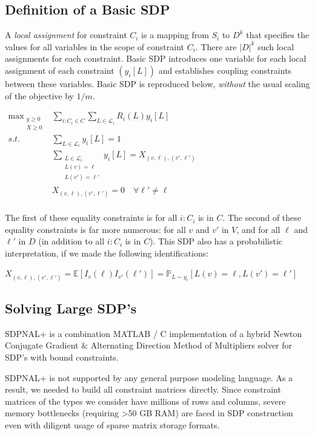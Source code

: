 \documentclass[11pt]{article} %
\begin{document}
\subsection{Definition of a Basic SDP}

A \emph{local assignment} for constraint $C_i$ is a mapping from $S_i$ to $D^k$ that specifies the values for all variables in the scope of constraint $C_i$. There are $|D|^k$ such local assignments for each constraint. Basic SDP introduces one variable for each local assignment of each constraint $(y_i[L])$ and establishes coupling constraints between these variables. Basic SDP \citep{raghavendra2008optimal} is reproduced below, \emph{without} the usual scaling of the objective by $1/m$.

$\begin{aligned}
\operatorname*{max}_{\substack{y \geq 0 \\  X \geq 0}} & \sum\limits_{i:C_i\in C} \sum\limits_{L\in \mathcal{L}_i} R_i(L)y_i[L] \\
s.t. & \sum\limits_{L \in \mathcal{L}_i} y_i[L] = 1 \\
& \sum\limits_{\substack{L \in \mathcal{L}_i \\ L(v)=\ell \\ L(v')=\ell '}} y_i[L] = X_{(v,\ell),(v',\ell')} \\
& X_{(v,\ell),(v',\ell')} = 0 \quad \forall \ell' \neq \ell \\
\end{aligned}$

The first of these equality constraints is for all $i : C_i$ is in $C$. The second of these equality constraints is far more numerous: for all $v$ and $v'$ in $V$, and for all $\ell$ and $\ell'$ in $D$ (in addition to all $i:C_i$ is in $C$). This SDP also has a probabilistic interpretation, if we made the following identifications:

$X_{(v,\ell),(v',\ell')} = \mathbb{E}[I_v(\ell)I_{v'}(\ell')] = \mathbb{P}_{L\sim y_i}[L(v)=\ell, L(v')=\ell']$

\subsection{Solving Large SDP's}

SDPNAL+ \citep{yang2015sdpnal+, zhao2010newton} is a combination MATLAB / C implementation of a hybrid Newton Conjugate Gradient \& Alternating Direction Method of Multipliers solver for SDP's with bound constraints.

SDPNAL+ is not supported by any general purpose modeling language. As a result, we needed to build all constraint matrices directly. Since constraint matrices of the types we consider have millions of rows and columns, severe memory bottlenecks (requiring >50 GB RAM) are faced in SDP construction even with diligent usage of sparse matrix storage formats.
\end{document}
